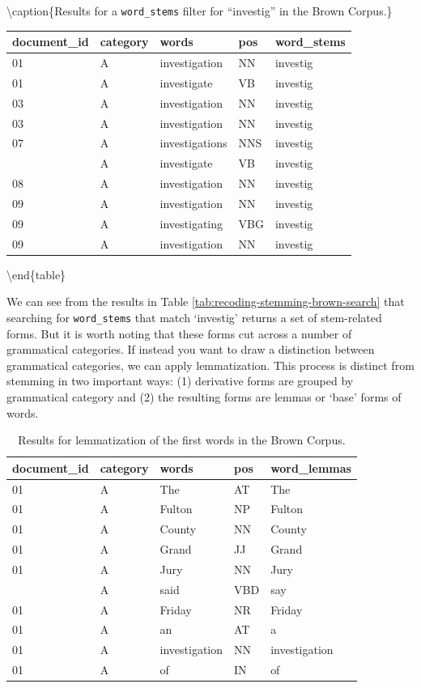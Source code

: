 \documentclass[
]{article}
\begin{document}
\textbackslash caption\{\label{tab:recoding-stemming-brown-search}Results for a \texttt{word\_stems} filter for ``investig'' in the Brown Corpus.\}
\centering

\begin{tabular}[t]{lllll}
\toprule
document\_id & category & words & pos & word\_stems\\
\midrule
01 & A & investigation & NN & investig\\
01 & A & investigate & VB & investig\\
03 & A & investigation & NN & investig\\
03 & A & investigation & NN & investig\\
07 & A & investigations & NNS & investig\\
\addlinespace
07 & A & investigate & VB & investig\\
08 & A & investigation & NN & investig\\
09 & A & investigation & NN & investig\\
09 & A & investigating & VBG & investig\\
09 & A & investigation & NN & investig\\
\bottomrule
\end{tabular}

\textbackslash end\{table\}

We can see from the results in Table \ref{tab:recoding-stemming-brown-search} that searching for \texttt{word\_stems} that match `investig' returns a set of stem-related forms. But it is worth noting that these forms cut across a number of grammatical categories. If instead you want to draw a distinction between grammatical categories, we can apply lemmatization. This process is distinct from stemming in two important ways: (1) derivative forms are grouped by grammatical category and (2) the resulting forms are lemmas or `base' forms of words.

\begin{table}

\caption{\label{tab:recoding-lemmatization-brown-example}Results for lemmatization of the first words in the Brown Corpus.}
\centering
\begin{tabular}[t]{lllll}
\toprule
document\_id & category & words & pos & word\_lemmas\\
\midrule
01 & A & The & AT & The\\
01 & A & Fulton & NP & Fulton\\
01 & A & County & NN & County\\
01 & A & Grand & JJ & Grand\\
01 & A & Jury & NN & Jury\\
\addlinespace
01 & A & said & VBD & say\\
01 & A & Friday & NR & Friday\\
01 & A & an & AT & a\\
01 & A & investigation & NN & investigation\\
01 & A & of & IN & of\\
\bottomrule
\end{tabular}
\end{table}
\end{document}
